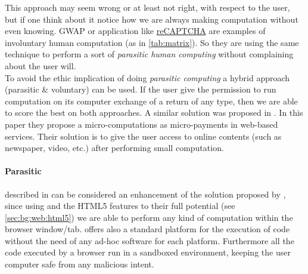 This approach may seem wrong or at least not right, with respect to the user, but
if one think about it notice how we are always making computation without even
knowing. \ac{GWAP} or application like \href{http://www.google.com/recaptcha}{reCAPTCHA}
are examples of involuntary human computation (as in \autoref{tab:matrix}). So
they are using the same technique to perform a sort of \emph{parasitic human
computing} without complaining about the user will.\\

To avoid the ethic implication of doing \emph{parasitic computing} a hybrid
approach (parasitic \& voluntary) can be used. If the user give the permission to
run computation on its computer exchange of a return of any type, then we are
able to score the best on both approaches. A similar solution was proposed in
\cite{karame2011pay}.
In this paper they propose a micro-computations as micro-payments in web-based
services. Their solution is to give the user access to online contents (such as
newspaper, video, etc.) after performing small \js{} computation.

\paragraph{Parasitic \js{}} described in \cite{jenkin2008parasitic} can be
considered an enhancement of the solution proposed by \cite{barabasi2001parasitic},
since using \js{} and the HTML5 features to their full potential (see
\ref{sec:bg:web:html5}) we are able to perform any kind of computation
within the browser window/tab. \js{} offers also a standard platform for the
execution of code without the need of any ad-hoc software for each platform.
Furthermore all the code executed by a browser run in a sandboxed environment,
keeping the user computer safe from any malicious intent.